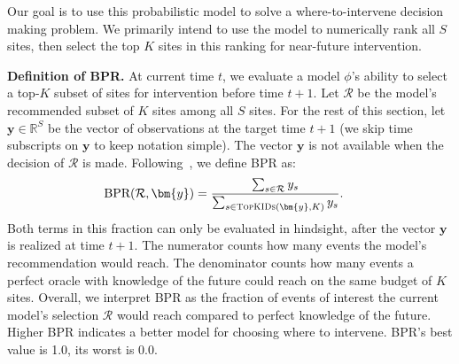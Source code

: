 
Our goal is to use this probabilistic model to solve a where-to-intervene decision making problem. We primarily intend to use the model to numerically rank all $S$ sites, then select the top $K$ sites in this ranking for near-future intervention. 


\textbf{Definition of BPR.}
At current time $t$, we evaluate a model $\phi$'s ability to select a top-$K$ subset of sites for intervention before time $t+1$. 
Let $\mathcal{R}$ be the model's recommended subset of $K$ sites among all $S$ sites.
For the rest of this section, let $\bm{y} \in \mathbb{R}^S$ be the vector of observations at the target time $t+1$ (we skip time subscripts on $\bm{y}$ to keep notation simple).
The vector $\bm{y}$ is not available when the decision of $\mathcal{R}$ is made.
Following~\citet{heutonPredictingSpatiotemporalCounts2022}, we define BPR as:
\begin{align}
    \text{BPR}( 
    \mathcal{R}, \bm{y}) &= 
    \label{eq:bpr}
    \frac
        { \sum_{s \in \mathcal{R}} y_{s}}
        { \sum_{s \in \textsc{TopKIDs}(\bm{y}, K)} y_{s}}.
\end{align}
Both terms in this fraction can only be evaluated in hindsight, after the vector $\bm{y}$ is realized at time $t+1$.
The numerator counts how many events the model's recommendation would reach. 
The denominator counts how many events a perfect oracle with knowledge of the future could reach on the same budget of $K$ sites.
Overall, we interpret BPR as the fraction of events of interest the current model's selection $\mathcal{R}$ would reach compared to perfect knowledge of the future.
Higher BPR indicates a better model for choosing where to intervene. BPR's best value is 1.0, its worst is 0.0.

